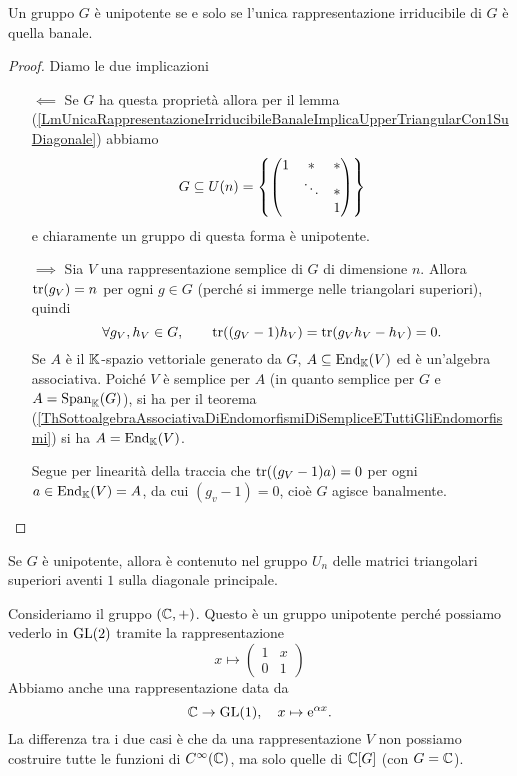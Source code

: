 \begin{theorem}\label{ThUnipotenteSeESoloSeUnicaRappresentazioneIrriducibileEBanale}
    Un gruppo $G$ è unipotente se e solo se l'unica rappresentazione irriducibile di $G$ è quella banale.
\end{theorem}
\begin{proof}
Diamo le due implicazioni
\setlength{\leftmargini}{0cm}
\begin{itemize}
\item[$\boxed{\impliedby}$] Se $G$ ha questa propriet\`a allora per il lemma (\ref{LmUnicaRappresentazioneIrriducibileBanaleImplicaUpperTriangularCon1SuDiagonale}) abbiamo
\[G\subseteq U(n)=\left\{{\begin{pmatrix}1 & \ast & \ast\\ &\ddots &\ast\\ &&1\end{pmatrix}}\right\}\]
e chiaramente un gruppo di questa forma \`e unipotente.
\item[$\boxed{\implies}$] Sia $V$ una rappresentazione semplice di $G$ di dimensione $n$. Allora $\operatorname{tr}(g_V)=n$ per ogni $g\in G$ (perch\'e si immerge nelle triangolari superiori), quindi
\[\forall g_V,h_V\in G,\qquad \operatorname{tr}((g_V-1)h_V)=\operatorname{tr}(g_Vh_V-h_V)=0.\]
Se $A$ \`e il $\mathbb{K}$-spazio vettoriale generato da $G$, $A\subseteq \operatorname{End}_{\mathbb{K}}(V)$ ed \`e un'algebra associativa. Poich\'e $V$ \`e semplice per $A$ (in quanto semplice per $G$ e $A=\operatorname{Span}_{\mathbb{K}}(G)$), si ha per il teorema (\ref{ThSottoalgebraAssociativaDiEndomorfismiDiSempliceETuttiGliEndomorfismi}) si ha $A=\operatorname{End}_{\mathbb{K}}(V)$.

Segue per linearit\`a della traccia che $\operatorname{tr}((g_V-1)a)=0$ per ogni $a\in \operatorname{End}_{\mathbb{K}}(V)=A$, da cui $(g_v-1)=0$, cio\`e $G$ agisce banalmente.
\end{itemize}
\setlength{\leftmargini}{0.5cm}
\end{proof}

\begin{corollary}
    Se $G$ è unipotente, allora è contenuto nel gruppo $U_n$ delle matrici triangolari superiori aventi $1$ sulla diagonale principale.
\end{corollary}

\begin{remark}
    Consideriamo il gruppo $(\mathbb{C},+)$. Questo è un gruppo unipotente perché possiamo vederlo in $\mathrm{GL}(2)$ tramite la rappresentazione \[x\mapsto \begin{pmatrix}
        1 & x \\ 0 & 1 
    \end{pmatrix}\]
    Abbiamo anche una rappresentazione data da \[ \mathbb{C}\to \mathrm{GL}(1), \quad x\mapsto \text{e}^{\alpha x}.\]
    La differenza tra i due casi è che da una rappresentazione $V$ non possiamo costruire tutte le funzioni di $C^{\infty}(\mathbb{C})$, ma solo quelle di $\mathbb{C}[G]$ (con $G=\mathbb{C}$).
\end{remark}


